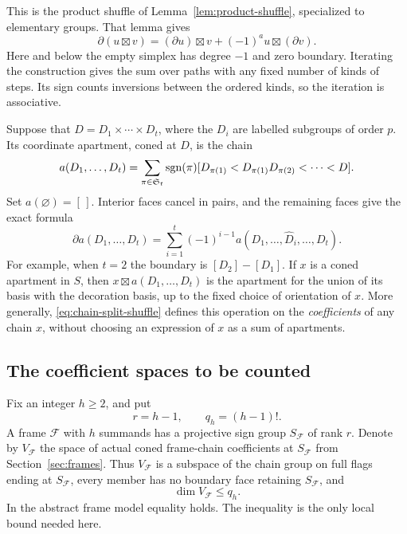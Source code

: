 This is the product shuffle of Lemma~\ref{lem:product-shuffle},
specialized to elementary groups. That lemma gives
\begin{equation}\label{eq:chain-shuffle-boundary}
 \partial(u\boxtimes v)
  =(\partial u)\boxtimes v+(-1)^a u\boxtimes(\partial v).
\end{equation}
Here and below the empty simplex has degree $-1$ and zero boundary.
Iterating the construction gives the
sum over paths with any fixed number of kinds of steps. Its sign
counts inversions between the ordered kinds, so the iteration is
associative.

Suppose that $D=D_1\times\cdots\times D_t$, where the $D_i$ are
labelled subgroups of order $p$. Its coordinate apartment, coned
at $D$, is the chain
\begin{equation}\label{eq:chain-decoration-apartment}
 a(D_1,\ldots,D_t)=
 \sum_{\pi\in\mathfrak S_t}\operatorname{sgn}(\pi)
 [D_{\pi(1)}<D_{\pi(1)}D_{\pi(2)}<\cdots<D].
\end{equation}
Set $a(\varnothing)=[\,]$. Interior faces cancel in pairs,
and the remaining faces give the exact formula
\begin{equation}\label{eq:chain-decoration-boundary}
 \partial a(D_1,\ldots,D_t)
 =\sum_{i=1}^t(-1)^{i-1}
    a(D_1,\ldots,\widehat D_i,\ldots,D_t).
\end{equation}
For example, when $t=2$ the boundary is $[D_2]-[D_1]$.
If $x$ is a coned apartment in $S$, then $x\boxtimes a(D_1,\ldots,D_t)$
is the apartment for the union of its basis with the decoration
basis, up to the fixed choice of orientation of $x$. More generally,
\eqref{eq:chain-split-shuffle} defines this operation on the
\emph{coefficients} of any chain $x$, without choosing an expression
of $x$ as a sum of apartments.

\subsection{The coefficient spaces to be counted}

Fix an integer $h\geq2$, and put
\[
 r=h-1,\qquad q_h=(h-1)!.
\]
A frame $\mathcal F$ with $h$ summands has a projective sign group
$S_{\mathcal F}$ of rank $r$. Denote by $V_{\mathcal F}$ the space
of actual coned frame-chain coefficients at $S_{\mathcal F}$ from
Section~\ref{sec:frames}. Thus $V_{\mathcal F}$ is a subspace of the
chain group on full flags ending at $S_{\mathcal F}$, every member
has no boundary face retaining $S_{\mathcal F}$, and
\begin{equation}\label{eq:chain-local-dimension}
 \dim V_{\mathcal F}\leq q_h.
\end{equation}
In the abstract frame model equality holds. The inequality is the
only local bound needed here.

